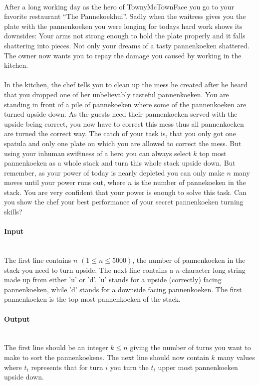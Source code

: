 



\makeheader \ \\
After a long working day as the hero of TownyMcTownFace you go to your favorite restaurant ``The Pannekoekhui''. Sadly when the waitress gives you the plate with the pannenkoeken you were longing for todays hard work shows its downsides: Your arms not strong enough to hold the plate properly and it falls shattering into pieces. Not only your dreams of a tasty pannenkoeken shattered. The owner now wants you to repay the damage you caused by working in the kitchen. \\ \ \\
In the kitchen, the chef tells you to clean up the mess he created after he heard that you dropped one of her unbelievably tasteful pannenkoeken. You are standing in front of a pile of pannekoeken where some of the pannenkoeken are turned upside down. As the guests need their pannenkoeken served with the upside being correct, you now have to correct this mess thus all pannenkoeken are turned the correct way. The catch of your task is, that you only got one spatula and only one plate on which you are allowed to correct the mess. But using your inhuman swiftness of a hero you can always select $k$ top most pannenkoeken as a whole stack and turn this whole stack upside down. But remember, as your power of today is nearly depleted you can only make $n$ many moves until your power runs out, where $n$ is the number of pannekoeken in the stack. You are very confident that your power is enough to solve this task. Can you show the chef your best performance of your secret pannenkoeken turning skills?


\paragraph*{Input}\ \\
The first line contains $n$ $(1 \leq n \leq  5000)$, the number of pannenkoeken in the stack you need to turn upside. The next line contains a $n$-character long string made up from either 'u' or 'd'. 'u' stands for a upside (correctly) facing pannenkoeken, while 'd' stands for a downside facing pannenkoeken. The first pannenkoeken is the top most pannenkoeken of the stack.

\paragraph*{Output}\ \\
The first line should be an integer $k \leq n$ giving the number of turns you want to make to sort the pannenkoekens. The next line should now contain $k$ many values where $t_i$ represents that for turn $i$ you turn the $t_i$ upper most pannenkoeken upside down.
\begin{samples}
\end{samples}

